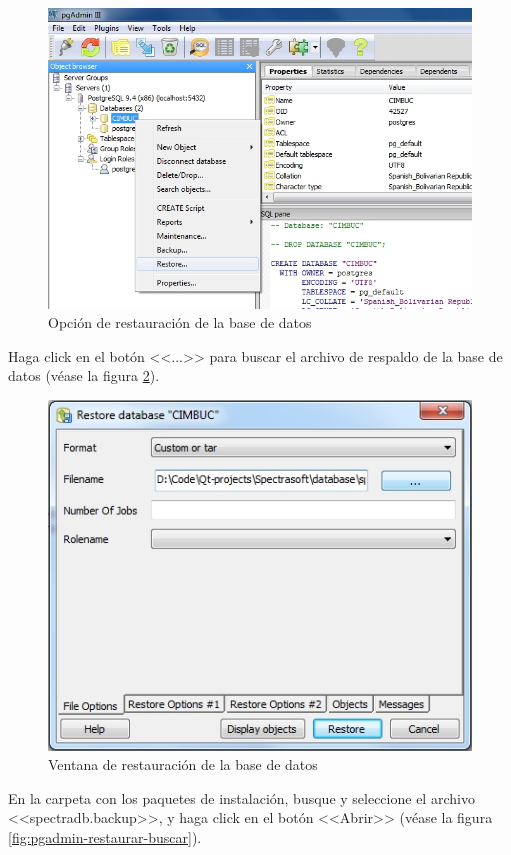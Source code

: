 \begin{figure}[H]
  \centering
  \includegraphics[width=1\linewidth]{./img/pgadmin-restaurar.jpg}
\caption[]{Opci\'{o}n de restauraci\'{o}n de la base de datos\label{fig:pgadmin-restaurar}}
\end{figure}

\newpage

Haga click en el bot\'{o}n <<...>> para buscar el archivo de respaldo de la base de datos (v\'{e}ase la figura \ref{fig:pgadmin-restaurar-ventana}).

\begin{figure}[H]
  \centering
  \includegraphics[width=.6\linewidth]{./img/pgadmin-restaurar-ventana.jpg}
\caption[]{Ventana de restauraci\'{o}n de la base de datos\label{fig:pgadmin-restaurar-ventana}}
\end{figure}

En la carpeta con los paquetes de instalaci\'{o}n, busque y seleccione el archivo <<spectradb.backup>>, y haga click en el bot\'{o}n <<Abrir>> (v\'{e}ase la figura \ref{fig:pgadmin-restaurar-buscar}).


